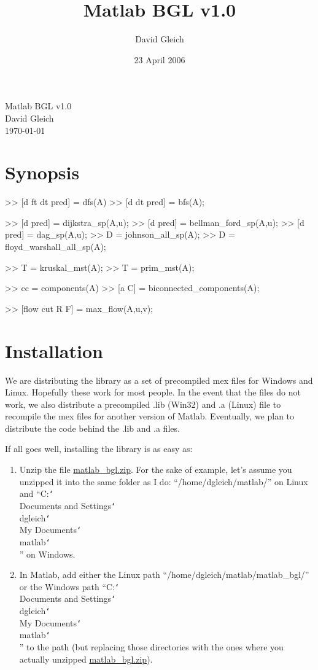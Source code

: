 \documentclass[12pt]{article}
\author{David Gleich}
\title{Matlab BGL v1.0}
\date{23 April 2006}
\newcommand{\mypath}[1]{{\ttfamily \small #1}}
\DeclareRobustCommand\cs[1]{\texttt{\char`\\#1}}
\begin{document}
{
\setlength{\parskip}{0pt}
\begin{center}
{\Large Matlab BGL v1.0}\\
David Gleich\\
\today
\end{center}
\tableofcontents
}

\section{Synopsis}

\begin{mcode}
>> [d ft dt pred] = dfs(A)
>> [d dt pred] = bfs(A);

>> [d pred] = dijkstra_sp(A,u);
>> [d pred] = bellman_ford_sp(A,u);
>> [d pred] = dag_sp(A,u);
>> D = johnson_all_sp(A);
>> D = floyd_warshall_all_sp(A);

>> T = kruskal_mst(A);
>> T = prim_mst(A);

>> cc = components(A)  
>> [a C] = biconnected_components(A);

>> [flow cut R F] = max_flow(A,u,v);
\end{mcode}

\section{Installation}
We are distributing the library as a set of precompiled mex files for Windows and Linux.  Hopefully these work for most people.  In the event that the files do not work, we also distribute a precompiled .lib (Win32) and .a (Linux) file to recompile the mex files for another version of Matlab.  Eventually, we plan to distribute the code behind the .lib and .a files.  

If all goes well, installing the library is as easy as:
\begin{enumerate}
\item	Unzip the file \url{matlab_bgl.zip}.  For the sake of example, let's assume you unzipped it into the same folder as I do: ``\mypath{/home/dgleich/matlab/}'' on Linux and ``\mypath{C:\cs{}Documents and Settings\cs{}dgleich\cs{}My Documents\cs{}matlab\cs{}}'' on Windows.
\item	In Matlab, add either the Linux path ``\mypath{/home/dgleich/matlab/matlab\_bgl/}'' or the Windows path ``\mypath{C:\cs{}Documents and Settings\cs{}dgleich\cs{}My Documents\cs{}matlab\cs{}}'' to the path (but replacing those directories with the ones where you actually unzipped \url{matlab_bgl.zip}).
\end{enumerate}
\end{document}
